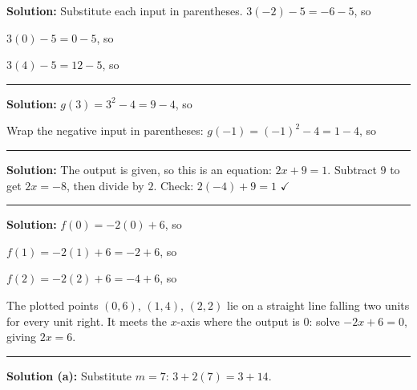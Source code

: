 \documentclass[12pt]{article}
\begin{document}



\textbf{Solution:} Substitute each input in parentheses. $3(-2) - 5 = -6 - 5$, so 

$3(0) - 5 = 0 - 5$, so 

$3(4) - 5 = 12 - 5$, so 

\vspace{0.2cm}\noindent\rule{\linewidth}{0.2pt}


\textbf{Solution:} $g(3) = 3^2 - 4 = 9 - 4$, so 

Wrap the negative input in parentheses: $g(-1) = (-1)^2 - 4 = 1 - 4$, so 

\vspace{0.2cm}\noindent\rule{\linewidth}{0.2pt}


\textbf{Solution:} The output is given, so this is an equation: $2x + 9 = 1$. Subtract $9$ to get $2x = -8$, then divide by $2$. Check: $2(-4) + 9 = 1$ $\checkmark$ 

\vspace{0.2cm}\noindent\rule{\linewidth}{0.2pt}


\textbf{Solution:} $f(0) = -2(0) + 6$, so 

$f(1) = -2(1) + 6 = -2 + 6$, so 

$f(2) = -2(2) + 6 = -4 + 6$, so 

The plotted points $(0,6)$, $(1,4)$, $(2,2)$ lie on a straight line falling two units for every unit right. It meets the $x$-axis where the output is $0$: solve $-2x + 6 = 0$, giving $2x = 6$. 

\vspace{0.2cm}\noindent\rule{\linewidth}{0.2pt}


\textbf{Solution (a):} Substitute $m = 7$: $3 + 2(7) = 3 + 14$. 
\end{document}
